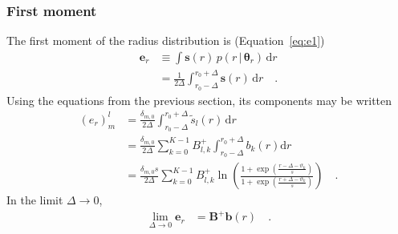 \documentclass[modern]{aastex62}
\begin{document}
\subsubsection{First moment}
%
The first moment of the radius distribution is (Equation~\ref{eq:e1})
%
\begin{align}
    \mathbf{e}_r
     & \equiv
    \int
    \mathbf{s}(r) \,
    p(r \, \big| \, \pmb{\theta}_{r}) \,
    \mathrm{d}r
    \nonumber \\
     & =
    \frac{1}{2\Delta}
    \int_{r_0 - \Delta}^{r_0 + \Delta}
    \mathbf{s}(r) \,
    \mathrm{d}r
    \quad.
\end{align}
%
Using the equations from the previous section, its components may be written
%
\begin{align}
    (e_r)^l_m
     & =
    \frac{\delta_{m,0}}{2\Delta}
    \int_{r_0 - \Delta}^{r_0 + \Delta}
    \tilde{s}_{l}(r) \,
    \mathrm{d}r
    \nonumber \\
     & =
    \frac{\delta_{m,0}}{2\Delta}
    \sum_{k=0}^{K-1} B^+_{l,k}
    \int_{r_0 - \Delta}^{r_0 + \Delta}
    b_{k}(r)
    \mathrm{d}r
    \nonumber \\
     & =
    \frac{\delta_{m,0} s}{2\Delta}
    \sum_{k=0}^{K-1} B^+_{l,k}
    \ln
    \left(
    \frac{
        1+\exp\left(\frac{r -\Delta -\vartheta_k}{s}\right)
    }
    {
        1+\exp\left(\frac{r + \Delta -\vartheta_k}{s}\right)
    }
    \right)
    \quad.
\end{align}
%
In the limit $\Delta \rightarrow 0$,
%
\begin{align}
    \lim_{\Delta \rightarrow 0}
    \mathbf{e}_r
     & =
    \mathbf{B}^+ \mathbf{b}(r)
    \quad.
\end{align}
%
\end{document}
